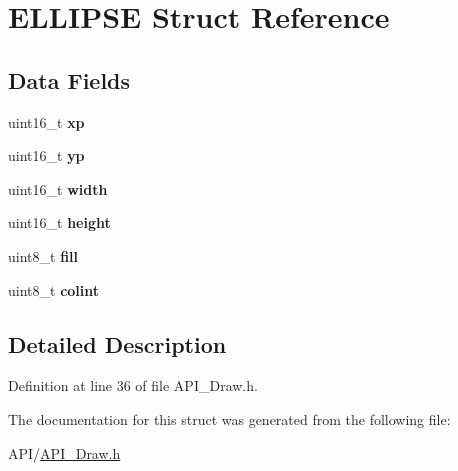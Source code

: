 \hypertarget{struct_e_l_l_i_p_s_e}{}\section{E\+L\+L\+I\+P\+SE Struct Reference}
\label{struct_e_l_l_i_p_s_e}
\subsection*{Data Fields}
\begin{DoxyCompactItemize}
\item 
\mbox{\label{struct_e_l_l_i_p_s_e_a949409b5dddb52782ff2cb935f4640fa}} 
uint16\+\_\+t {\bfseries xp}
\item 
\mbox{\label{struct_e_l_l_i_p_s_e_a59b81f7ac350cf9080d3d0b767580e4d}} 
uint16\+\_\+t {\bfseries yp}
\item 
\mbox{\label{struct_e_l_l_i_p_s_e_ad0eab1042455a2067c812ab8071d5376}} 
uint16\+\_\+t {\bfseries width}
\item 
\mbox{\label{struct_e_l_l_i_p_s_e_a81c9f8d0b8c3b49d770be14dbe9f0d37}} 
uint16\+\_\+t {\bfseries height}
\item 
\mbox{\label{struct_e_l_l_i_p_s_e_a2ffb43952012965173826ee9554c864a}} 
uint8\+\_\+t {\bfseries fill}
\item 
\mbox{\label{struct_e_l_l_i_p_s_e_a21caa4b27a71b7967f1a2d64f196a674}} 
uint8\+\_\+t {\bfseries colint}
\end{DoxyCompactItemize}


\subsection{Detailed Description}


Definition at line 36 of file A\+P\+I\+\_\+\+Draw.\+h.



The documentation for this struct was generated from the following file\+:\begin{DoxyCompactItemize}
\item 
A\+P\+I/\hyperlink{_a_p_i___draw_8h}{A\+P\+I\+\_\+\+Draw.\+h}\end{DoxyCompactItemize}

